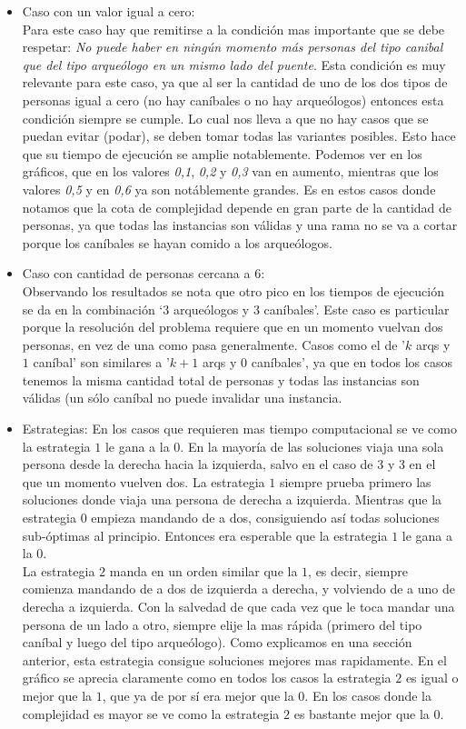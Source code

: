 \begin{itemize}
	\item Caso con un valor igual a cero: \\
	Para este caso hay que remitirse a la condición mas importante que se debe respetar: \textit{No puede haber en ningún momento más personas del tipo canibal que del tipo arqueólogo en un mismo lado del puente}. Esta condición es muy relevante para este caso, ya que al ser la cantidad de uno de los dos tipos de personas igual a cero (no hay caníbales o no hay arqueólogos) entonces esta condición siempre se cumple. Lo cual nos lleva a que no hay casos que se puedan evitar (podar), se deben tomar todas las variantes posibles. Esto hace que su tiempo de ejecución se amplie notablemente.
	Podemos ver en los gráficos, que en los valores \textit{0,1}, \textit{0,2} y \textit{0,3} van en aumento, mientras que los valores \textit{0,5} y en \textit{0,6} ya son notáblemente grandes.
Es en estos casos donde notamos que la cota de complejidad depende en gran parte de la cantidad de personas, ya que todas las instancias son válidas y una rama no se va a cortar porque los caníbales se hayan comido a los arqueólogos.

	\item Caso con cantidad de personas cercana a 6: \\
	Observando los resultados se nota que otro pico en los tiempos de ejecución se da en la combinación `3 arqueólogos y 3 caníbales'. Este caso es particular porque la resolución del problema requiere que en un momento vuelvan dos personas, en vez de una como pasa generalmente. 
Casos como el de '$k$ arqs y $1$ caníbal' son similares a '$k+1$ arqs y $0$ caníbales', ya que en todos los casos tenemos la misma cantidad total de personas y todas las instancias son válidas (un sólo caníbal no puede invalidar una instancia.

\item Estrategias: En los casos que requieren mas tiempo computacional se ve como la estrategia $1$ le gana a la $0$. En la mayoría de las soluciones viaja una sola persona desde la derecha hacia la izquierda, salvo en el caso de 3 y 3 en el que un momento vuelven dos. La estrategia $1$ siempre prueba primero las soluciones donde viaja una persona de derecha a izquierda. Mientras que la estrategia $0$ empieza mandando de a dos, consiguiendo así todas soluciones sub-óptimas al principio. Entonces era esperable que la estrategia $1$ le gana a la $0$.
\\
La estrategia $2$ manda en un orden similar que la $1$, es decir, siempre comienza mandando de a dos de izquierda a derecha, y volviendo de a uno de derecha a izquierda. Con la salvedad de que cada vez que le toca mandar una persona de un lado a otro, siempre elije la mas rápida (primero del tipo caníbal y luego del tipo arqueólogo). Como explicamos en una sección anterior, esta estrategia consigue soluciones mejores mas rapidamente. 
En el gráfico se aprecia claramente como en todos los casos la estrategia $2$ es igual o mejor que la $1$, que ya de por sí era mejor que la $0$.  En los casos donde la complejidad es mayor se ve como la estrategia $2$ es bastante mejor que la $0$.
\end{itemize}

